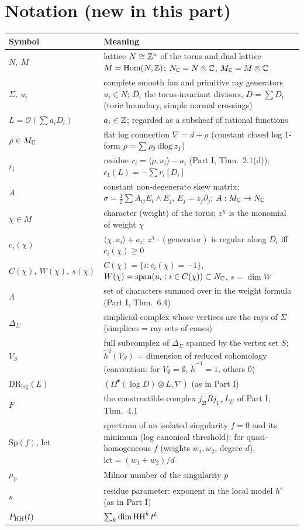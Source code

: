 \section{Notation (new in this part)}\label{p2:sec:notation}
\begin{longtable}{>{\raggedright\arraybackslash}p{3.6cm}>{\raggedright\arraybackslash}p{11.4cm}}
\toprule Symbol & Meaning\\ \midrule\endhead
$N,\ M$ & lattice $N\cong\mathbb Z^n$ of the torus and dual lattice $M=\mathrm{Hom}(N,\mathbb Z)$; $N_\mathbb C=N\otimes\mathbb C$, $M_\mathbb C=M\otimes\mathbb C$\\
$\Sigma,\ u_i$ & complete smooth fan and primitive ray generators $u_i\in N$; $D_i$ the torus-invariant divisors, $D=\sum D_i$ (toric boundary, simple normal crossings)\\
$L=\mathcal O(\sum a_iD_i)$ & $a_i\in\mathbb Z$; regarded as a subsheaf of rational functions\\
$\rho\in M_\mathbb C$ & flat log connection $\nabla=d+\rho$ (constant closed log 1-form $\rho=\sum\rho_j\,\mathrm{dlog}\, z_j$)\\
$r_i$ & residue $r_i=\langle\rho,u_i\rangle-a_i$ (Part I, Thm.\ 2.1(d)); $c_1(L)=-\sum r_i[D_i]$\\
$A$ & constant non-degenerate skew matrix; $\sigma=\tfrac12\sum A_{ij}E_i\wedge E_j$, $E_j=z_j\partial_j$; $A:M_\mathbb C\to N_\mathbb C$\\
$\chi\in M$ & character (weight) of the torus; $z^\chi$ is the monomial of weight $\chi$\\
$c_i(\chi)$ & $\langle\chi,u_i\rangle+a_i$; $z^\chi\cdot(\text{generator})$ is regular along $D_i$ iff $c_i(\chi)\ge0$\\
$C(\chi),\ W(\chi),\ s(\chi)$ & $C(\chi)=\{i:c_i(\chi)=-1\}$, $W(\chi)=\mathrm{span}(u_i:i\in C(\chi))\subset N_\mathbb C$, $s=\dim W$\\
$\Lambda$ & set of characters summed over in the weight formula (Part I, Thm.\ 6.4)\\
$\Delta_\Sigma$ & simplicial complex whose vertices are the rays of $\Sigma$ (simplices = ray sets of cones)\\
$V_S$ & full subcomplex of $\Delta_\Sigma$ spanned by the vertex set $S$; $\tilde h^q(V_S)$ = dimension of reduced cohomology (convention: for $V_\emptyset=\emptyset$, $\tilde h^{-1}=1$, others $0$)\\
$\mathrm{DR}_{\log}(L)$ & $(\Omega^\bullet(\log D)\otimes L,\nabla)$ (as in Part I)\\
$F$ & the constructible complex $j_{2!}Rj_{1*}L_U$ of Part I, Thm.\ 4.1\\
$\mathrm{Sp}(f)$, $\mathrm{lct}$ & spectrum of an isolated singularity $f=0$ and its minimum (log canonical threshold); for quasi-homogeneous $f$ (weights $w_1,w_2$, degree $d$), $\mathrm{lct}=(w_1+w_2)/d$\\
$\mu_p$ & Milnor number of the singularity $p$\\
$s$ & residue parameter: exponent in the local model $h^s$ (as in Part I)\\
$P_{\mathrm{HH}}(t)$ & $\sum_k\dim\mathrm{HH}^k\,t^k$\\
\bottomrule
\end{longtable}
